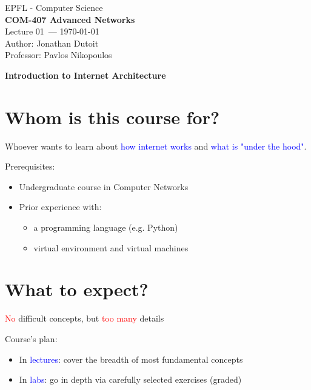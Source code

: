 \documentclass[11pt]{article}
\newcommand{\coursename}{COM-407 Advanced Networks}
\newcommand{\lecturenum}{01}
\newcommand{\lecturedate}{\today}
\begin{document}
\begin{center}
  {\large EPFL - Computer Science} \\[0.5em]
  {\Large \textbf{\coursename}} \\[0.5em]
  {\large Lecture \lecturenum\ --- \lecturedate} \\[0.5em]
  {\large Author: Jonathan Dutoit} \\
  {\large Professor: Pavlos Nikopoulos}
\end{center}

\vspace{2cm}

\begin{center}
  {\LARGE \textbf{Introduction to Internet Architecture}}
\end{center}

\vspace{1cm}
\section*{Whom is this course for?}
Whoever wants to learn about \textcolor{blue}{how internet works} and \textcolor{blue}{what is "under the hood"}. 

Prerequisites: 
\begin{itemize}
	\item Undergraduate course in Computer Networks
	\item Prior experience with: 
	\begin{itemize}
		\item a programming language (e.g. Python)
		\item virtual environment and virtual machines
	\end{itemize}
\end{itemize}

\section*{What to expect?}
\textcolor{red}{No} difficult concepts, but \textcolor{red}{too many} details

Course's plan: 
\begin{itemize}
	\item In \textcolor{blue}{lectures}: cover the breadth of most fundamental concepts
	\item In \textcolor{blue}{labs}: go in depth via carefully selected exercises (graded)
\end{itemize}
\end{document}
